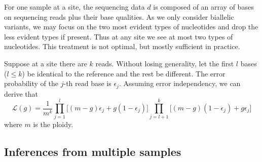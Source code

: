 \documentclass{bioinfo}
\begin{document}
\begin{methods}
For one sample at a site, the sequencing data $d$ is composed of an array of
bases on sequencing reads plus their base qualities. As we only consider
biallelic variants, we may focus on the two most evident types of nucleotides
and drop the less evident types if present. Thus at any site we see at most two
types of nucleotides. This treatment is not optimal, but mostly sufficient in
practice.

Suppose at a site there are $k$ reads. Without losing generality, let the first
$l$ bases ($l\le k$) be identical to the reference and the rest be different.
The error probability of the $j$-th read base is $\epsilon_j$.  Assuming error
independency, we can derive that
\begin{equation}\label{equ:glk}
\mathcal{L}(g)=\frac{1}{m^k}\prod_{j=1}^l\Big[(m-g)\epsilon_j+g(1-\epsilon_j)\Big]\prod_{j=l+1}^k\Big[(m-g)(1-\epsilon_j)+g\epsilon_j\Big]
\end{equation}
where $m$ is the ploidy.


\subsection{Inferences from multiple samples}


\end{methods}
\end{document}
